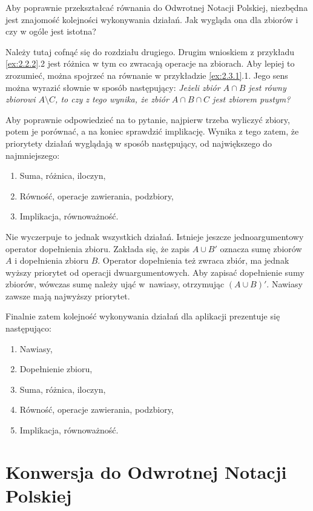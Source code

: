 \documentclass{SGGW-thesis}
\begin{document}
\begin{paragraph}{}
    Aby poprawnie przekształcać równania do Odwrotnej Notacji Polskiej, niezbędna jest znajomość kolejności wykonywania działań. Jak wygląda ona dla zbiorów i czy w ogóle jest istotna?

    Należy tutaj cofnąć się do rozdziału drugiego. Drugim wnioskiem z przykładu \ref{ex:2.2.2}.2 jest różnica w tym co zwracają operacje na zbiorach. Aby lepiej to zrozumieć, można spojrzeć na równanie w przykładzie \ref{ex:2.3.1}.1. Jego sens można wyrazić słownie w sposób następujący: \emph{Jeżeli zbiór $A \cap B$ jest równy zbiorowi $A \setminus C$, to czy z tego wynika, że zbiór $A \cap B \cap C$ jest zbiorem pustym?}

    Aby poprawnie odpowiedzieć na to pytanie, najpierw trzeba wyliczyć zbiory, potem je porównać, a na koniec sprawdzić implikację. Wynika z tego zatem, że priorytety działań wyglądają w sposób następujący, od największego do najmniejszego:
    \begin{enumerate}
        \item Suma, różnica, iloczyn,
        \item Równość, operacje zawierania, podzbiory,
        \item Implikacja, równoważność.
    \end{enumerate}

    Nie wyczerpuje to jednak wszystkich działań. Istnieje jeszcze jednoargumentowy operator dopełnienia zbioru. Zakłada się, że zapis $A \cup B'$ oznacza sumę zbiorów $A$ i dopełnienia zbioru $B$. Operator dopełnienia też zwraca zbiór, ma jednak wyższy priorytet od operacji dwuargumentowych. Aby zapisać dopełnienie sumy zbiorów, wówczas sumę należy ująć w~nawiasy, otrzymując $\left( A \cup B \right)'$. Nawiasy zawsze mają najwyższy priorytet.

    Finalnie zatem kolejność wykonywania działań dla aplikacji prezentuje się następująco:
    \begin{enumerate}
        \item Nawiasy,
        \item Dopełnienie zbioru,
        \item Suma, różnica, iloczyn,
        \item Równość, operacje zawierania, podzbiory,
        \item Implikacja, równoważność.
    \end{enumerate}
\end{paragraph}

\section{Konwersja do Odwrotnej Notacji Polskiej}
\end{document}
